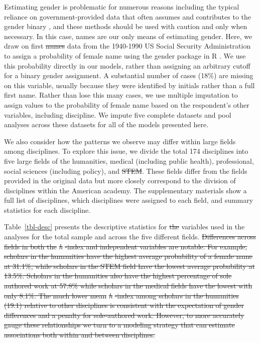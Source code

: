 \documentclass[
  10pt,
  letterpaper,
]{article}
\providecommand{\DIFaddtex}[1]{{\protect\color{blue}\uwave{#1}}} %
\providecommand{\DIFdeltex}[1]{{\protect\color{red}\sout{#1}}}                      %
\providecommand{\DIFaddbegin}{} %
\providecommand{\DIFaddend}{} %
\providecommand{\DIFdelbegin}{} %
\providecommand{\DIFdelend}{} %
\providecommand{\DIFadd}[1]{\texorpdfstring{\DIFaddtex{#1}}{#1}} %
\providecommand{\DIFdel}[1]{\texorpdfstring{\DIFdeltex{#1}}{}} %
\newcommand{\DIFscaledelfig}{0.5}
\newlength{\DIFdelgraphicswidth} %
\newlength{\DIFdelgraphicsheight} %
\newcommand{\DIFaddincludegraphics}[2][]{{\color{blue}\fbox{\DIFOincludegraphics[#1]{#2}}}} %
\newcommand{\DIFdelincludegraphics}[2][]{%
\sbox{\DIFdelgraphicsbox}{\DIFOincludegraphics[#1]{#2}}%
\settoboxwidth{\DIFdelgraphicswidth}{\DIFdelgraphicsbox} %
\settoboxtotalheight{\DIFdelgraphicsheight}{\DIFdelgraphicsbox} %
\scalebox{\DIFscaledelfig}{%
\parbox[b]{\DIFdelgraphicswidth}{\usebox{\DIFdelgraphicsbox}\\[-\baselineskip] \rule{\DIFdelgraphicswidth}{0em}}\llap{\resizebox{\DIFdelgraphicswidth}{\DIFdelgraphicsheight}{%
\setlength{\unitlength}{\DIFdelgraphicswidth}%
\begin{picture}(1,1)%
\thicklines\linethickness{2pt} %
{\color[rgb]{1,0,0}\put(0,0){\framebox(1,1){}}}%
{\color[rgb]{1,0,0}\put(0,0){\line( 1,1){1}}}%
{\color[rgb]{1,0,0}\put(0,1){\line(1,-1){1}}}%
\end{picture}%
}\hspace*{3pt}}} %
} %
\DeclareRobustCommand{\DIFaddbegin}{\DIFOaddbegin \let\includegraphics\DIFaddincludegraphics} %
\DeclareRobustCommand{\DIFaddend}{\DIFOaddend \let\includegraphics\DIFOincludegraphics} %
\DeclareRobustCommand{\DIFdelbegin}{\DIFOdelbegin \let\includegraphics\DIFdelincludegraphics} %
\DeclareRobustCommand{\DIFdelend}{\DIFOaddend \let\includegraphics\DIFOincludegraphics} %
\begin{document}
Estimating gender is problematic for numerous reasons including the
typical reliance on government-provided data that often assumes and
contributes to the gender binary \citep{mihaljevic_reflections_2019},
and these methods should be used with caution and only when necessary.
In this case, names are our only means of estimating gender. Here, we
draw on first \DIFdelbegin \DIFdel{names }\DIFdelend \DIFaddbegin \DIFadd{name }\DIFaddend data from the 1940-1990 US Social Security
Administration to assign a probability of female name using the gender
package in R \citep{blevins_jane_2015}. We use this probability directly
in our models, rather than assigning an arbitrary cutoff for a binary
gender assignment. A substantial number of cases (18\%) are missing on
this variable, usually because they were identified by initials rather
than a full first name. Rather than lose this many cases, we use
multiple imputation to assign values to the probability of female name
based on the respondent's other variables, including discipline. We
impute five complete datasets and pool analyses across these datasets
for all of the models presented here.

We also consider how the patterns we observe may differ within large
fields among disciplines. To explore this issue, we divide the total 174
disciplines into five large fields of the humanities, medical (including
public health), professional, social sciences (including policy), and
\DIFdelbegin \DIFdel{STEM}\DIFdelend \DIFaddbegin \DIFadd{science, technology, engineering, and math (STEM)}\DIFaddend . These fields differ
from the fields provided in the original data but more closely
correspond to the division of disciplines within the American academy.
The supplementary materials show a full list of disciplines, which
disciplines were assigned to each field, and summary statistics for each
discipline.

Table~\ref{tbl-desc} presents the descriptive statistics for \DIFdelbegin \DIFdel{the
}\DIFdelend \DIFaddbegin \DIFadd{all
}\DIFaddend variables used in the analyses for the total sample and across the five
different fields.
\DIFdelbegin \DIFdel{Differences across fields in both the }\emph{\DIFdel{h}}%
\DIFdel{-index
and independent variables are notable. For example, scholars in the
humanities have the highest average probability of a female name at
31.1\%, while scholars in the STEM field have the lowest average
probability at 13.5\%. Scholars in the humanities also have the highest
percentage of sole authored work at 57.8\% while scholars in the medical
fields have the lowest with only 8.1\%. The much lower mean
}\emph{\DIFdel{h}}%
\DIFdel{-index among scholars in the humanities (19.1) relative to other
disciplines is consistent with the expectation of gender differences and
a penalty for sole-authored work. However, to more accurately gauge
these relationships we turn to a modeling strategy that can estimate
associations both within and between disciplines.
}\DIFdelend 
\end{document}
